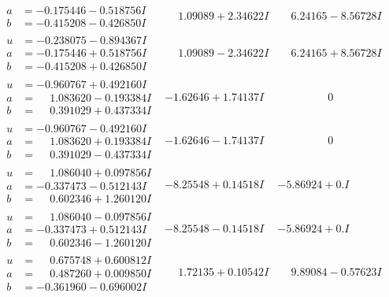 \documentclass[1p]{elsarticle_modified}
\theoremstyle{definition}
\begin{document}
$$\begin{array}{c|c|c}
\begin{aligned}
a &= -0.175446 - 0.518756 I \\
b &= -0.415208 - 0.426850 I\end{aligned}
 & \phantom{-}1.09089 + 2.34622 I & \phantom{-}6.24165 - 8.56728 I \\ \hline\begin{aligned}
u &= -0.238075 - 0.894367 I \\
a &= -0.175446 + 0.518756 I \\
b &= -0.415208 + 0.426850 I\end{aligned}
 & \phantom{-}1.09089 - 2.34622 I & \phantom{-}6.24165 + 8.56728 I \\ \hline\begin{aligned}
u &= -0.960767 + 0.492160 I \\
a &= \phantom{-}1.083620 - 0.193384 I \\
b &= \phantom{-}0.391029 + 0.437334 I\end{aligned}
 & -1.62646 + 1.74137 I & \phantom{-0.000000 } 0 \\ \hline\begin{aligned}
u &= -0.960767 - 0.492160 I \\
a &= \phantom{-}1.083620 + 0.193384 I \\
b &= \phantom{-}0.391029 - 0.437334 I\end{aligned}
 & -1.62646 - 1.74137 I & \phantom{-0.000000 } 0 \\ \hline\begin{aligned}
u &= \phantom{-}1.086040 + 0.097856 I \\
a &= -0.337473 - 0.512143 I \\
b &= \phantom{-}0.602346 + 1.260120 I\end{aligned}
 & -8.25548 + 0.14518 I & -5.86924 + 0. I\phantom{ +0.000000I} \\ \hline\begin{aligned}
u &= \phantom{-}1.086040 - 0.097856 I \\
a &= -0.337473 + 0.512143 I \\
b &= \phantom{-}0.602346 - 1.260120 I\end{aligned}
 & -8.25548 - 0.14518 I & -5.86924 + 0. I\phantom{ +0.000000I} \\ \hline\begin{aligned}
u &= \phantom{-}0.675748 + 0.600812 I \\
a &= \phantom{-}0.487260 + 0.009850 I \\
b &= -0.361960 - 0.696002 I\end{aligned}
 & \phantom{-}1.72135 + 0.10542 I & \phantom{-}9.89084 - 0.57623 I \\ \hline\begin{aligned}

\end{aligned}
\end{array}$$
\end{document}

